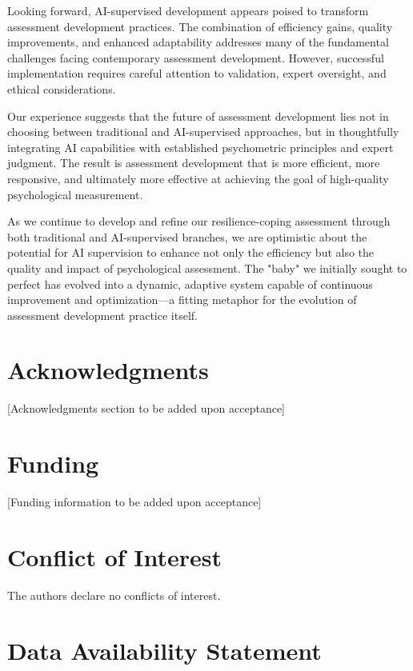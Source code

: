 \documentclass[12pt,a4paper]{article}
\begin{document}
Looking forward, AI-supervised development appears poised to transform assessment development practices. The combination of efficiency gains, quality improvements, and enhanced adaptability addresses many of the fundamental challenges facing contemporary assessment development. However, successful implementation requires careful attention to validation, expert oversight, and ethical considerations.

Our experience suggests that the future of assessment development lies not in choosing between traditional and AI-supervised approaches, but in thoughtfully integrating AI capabilities with established psychometric principles and expert judgment. The result is assessment development that is more efficient, more responsive, and ultimately more effective at achieving the goal of high-quality psychological measurement.

As we continue to develop and refine our resilience-coping assessment through both traditional and AI-supervised branches, we are optimistic about the potential for AI supervision to enhance not only the efficiency but also the quality and impact of psychological assessment. The "baby" we initially sought to perfect has evolved into a dynamic, adaptive system capable of continuous improvement and optimization—a fitting metaphor for the evolution of assessment development practice itself.

\section{Acknowledgments}

[Acknowledgments section to be added upon acceptance]

\section{Funding}

[Funding information to be added upon acceptance]

\section{Conflict of Interest}

The authors declare no conflicts of interest.

\section{Data Availability Statement}
\end{document}
